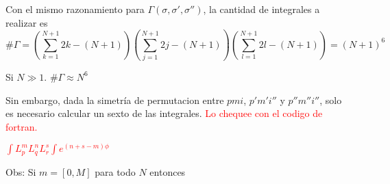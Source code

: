 				Con el mismo razonamiento para $\Gamma(\sigma, \sigma', \sigma'' ) $, la cantidad de integrales a realizar es 
				\[\# \Gamma=(\sum_{k=1}^{N+1}2k-(N+1))(\sum_{j=1}^{N+1}2j-(N+1))(\sum_{l=1}^{N+1}2l-(N+1))=(N+1)^6\]
				
				Si $N \gg 1$. $\#\Gamma \approx N^6$
				
				Sin embargo, dada la simetría de permutacion entre $pmi$, $p'm'i''$ y $p''m''i''$, solo es necesario calcular un sexto de las integrales.
			\textcolor{red}{Lo chequee con el codigo de fortran.}
			
			\textcolor{red}{$\int L_p^m L_q^n L_r^s \int e^{(n+s-m)\phi}$}
			
			Obs: Si $m=[0,M]$ para todo $N$ entonces
	